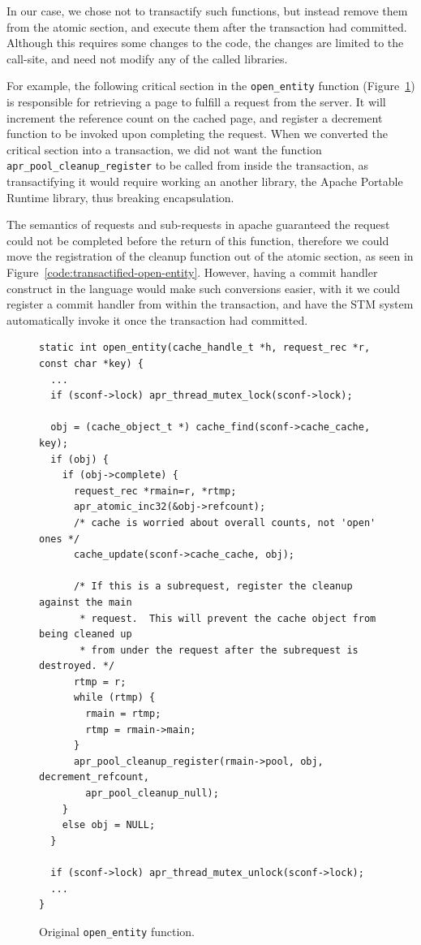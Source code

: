 \documentclass[preprint,11pt]{sigplanconf}
\begin{document}
In our case, we chose not to transactify such functions, but instead remove them
from the atomic section, and execute them after the transaction had committed.
Although this requires some changes to the code, the changes are limited to the
call-site, and need not modify any of the called libraries.

For example, the following critical section in the {\tt open\_entity} function
(Figure~\ref{code:original-open-entity}) is responsible for retrieving a page
to fulfill a request from the server. It will increment the reference count on
the cached page, and register a decrement function to be invoked upon completing
the request. When we converted the critical section into a transaction, we
did not want the function {\tt apr\_pool\_cleanup\_register} to be called from
inside the transaction, as transactifying it would require working an another
library, the Apache Portable Runtime library, thus breaking encapsulation.

The semantics of requests and sub-requests in apache guaranteed the request
could not be completed before the return of this function, therefore we could
move the registration of the cleanup function out of the atomic section, as seen
in Figure~\ref{code:transactified-open-entity}. However, having a commit
handler construct in the language would make such conversions easier, with it we
could register a commit handler from within the transaction, and have the STM
system automatically invoke it once the transaction had committed.

\begin{figure}
\begin{lstlisting}
static int open_entity(cache_handle_t *h, request_rec *r, const char *key) {
  ...
  if (sconf->lock) apr_thread_mutex_lock(sconf->lock);

  obj = (cache_object_t *) cache_find(sconf->cache_cache, key);
  if (obj) {
    if (obj->complete) {
      request_rec *rmain=r, *rtmp;
      apr_atomic_inc32(&obj->refcount);
      /* cache is worried about overall counts, not 'open' ones */
      cache_update(sconf->cache_cache, obj);

      /* If this is a subrequest, register the cleanup against the main
       * request.  This will prevent the cache object from being cleaned up
       * from under the request after the subrequest is destroyed. */
      rtmp = r;
      while (rtmp) {
        rmain = rtmp;
        rtmp = rmain->main;
      }
      apr_pool_cleanup_register(rmain->pool, obj, decrement_refcount, 
        apr_pool_cleanup_null);
    }
    else obj = NULL;
  }

  if (sconf->lock) apr_thread_mutex_unlock(sconf->lock);
  ...
}
\end{lstlisting}
\caption{Original {\tt open\_entity} function.}
\label{code:original-open-entity}
\end{figure}
\end{document}
